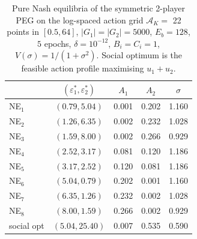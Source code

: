 \begin{table}[t]
\centering
\caption{Pure Nash equilibria of the symmetric 2-player PEG on the log-spaced action grid $\mathcal{A}_K = $ 22 points in $[0.5, 64]$, $|G_1|=|G_2|=5000$, $E_b=128$, $5$ epochs, $\delta=10^{-12}$, $B_i = C_i = 1$, $V(\sigma) = 1/(1+\sigma^2)$. Social optimum is the feasible action profile maximising $u_1+u_2$.}
\label{tab:NE}
\begin{tabular}{lcccc}
\toprule
 & $(\varepsilon_1^*, \varepsilon_2^*)$ & $A_1$ & $A_2$ & $\sigma$ \\
\midrule
NE$_{1}$ & $(0.79, 5.04)$ & 0.001 & 0.202 & 1.160 \\
NE$_{2}$ & $(1.26, 6.35)$ & 0.002 & 0.232 & 1.028 \\
NE$_{3}$ & $(1.59, 8.00)$ & 0.002 & 0.266 & 0.929 \\
NE$_{4}$ & $(2.52, 3.17)$ & 0.081 & 0.120 & 1.186 \\
NE$_{5}$ & $(3.17, 2.52)$ & 0.120 & 0.081 & 1.186 \\
NE$_{6}$ & $(5.04, 0.79)$ & 0.202 & 0.001 & 1.160 \\
NE$_{7}$ & $(6.35, 1.26)$ & 0.232 & 0.002 & 1.028 \\
NE$_{8}$ & $(8.00, 1.59)$ & 0.266 & 0.002 & 0.929 \\
social opt & $(5.04, 25.40)$ & 0.007 & 0.535 & 0.590 \\
\bottomrule
\end{tabular}
\end{table}